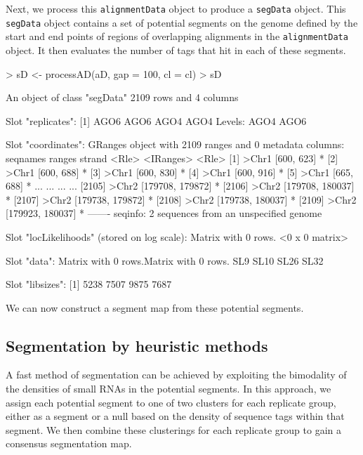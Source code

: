 \documentclass[a4paper]{article}
\begin{document}
Next, we process this \verb'alignmentData' object to produce a \verb'segData' object. This \verb'segData' object contains a set of potential segments on the genome defined by the start and end points of regions of overlapping alignments in the \verb'alignmentData' object. It then evaluates the number of tags that hit in each of these segments.

\begin{Schunk}
\begin{Sinput}
> sD <- processAD(aD, gap = 100, cl = cl)
> sD
\end{Sinput}
\begin{Soutput}
An object of class "segData"
2109 rows and 4 columns

Slot "replicates":
[1] AGO6 AGO6 AGO4 AGO4
Levels: AGO4 AGO6

Slot "coordinates":
GRanges object with 2109 ranges and 0 metadata columns:
         seqnames           ranges strand
            <Rle>        <IRanges>  <Rle>
     [1]    >Chr1       [600, 623]      *
     [2]    >Chr1       [600, 688]      *
     [3]    >Chr1       [600, 830]      *
     [4]    >Chr1       [600, 916]      *
     [5]    >Chr1       [665, 688]      *
     ...      ...              ...    ...
  [2105]    >Chr2 [179708, 179872]      *
  [2106]    >Chr2 [179708, 180037]      *
  [2107]    >Chr2 [179738, 179872]      *
  [2108]    >Chr2 [179738, 180037]      *
  [2109]    >Chr2 [179923, 180037]      *
  -------
  seqinfo: 2 sequences from an unspecified genome

Slot "locLikelihoods" (stored on log scale):
Matrix with  0  rows.
<0 x 0 matrix>

Slot "data":
Matrix with  0  rows.Matrix with  0  rows.
     SL9 SL10 SL26 SL32

Slot "libsizes":
[1] 5238 7507 9875 7687
\end{Soutput}
\end{Schunk}

We can now construct a segment map from these potential segments.

\subsection*{Segmentation by heuristic methods}

A fast method of segmentation can be achieved by exploiting the bimodality of the densities of small RNAs in the potential segments. In this approach, we assign each potential segment to one of two clusters for each replicate group, either as a segment or a null based on the density of sequence tags within that segment. We then combine these clusterings for each replicate group to gain a consensus segmentation map.
\end{document}
